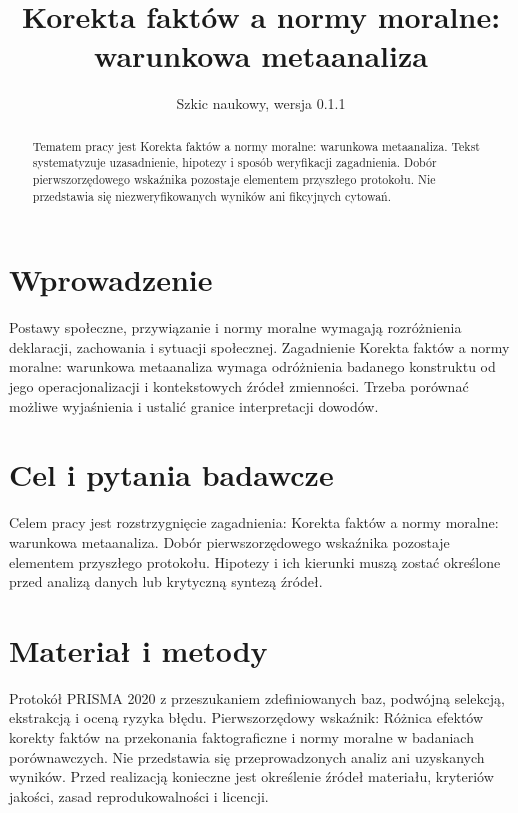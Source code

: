 \documentclass[11pt,a4paper]{article}
\title{Korekta faktów a normy moralne: warunkowa metaanaliza}
\author{}
\date{Szkic naukowy, wersja 0.1.1}
\begin{document}
\maketitle

\begin{abstract}

Tematem pracy jest Korekta faktów a normy moralne: warunkowa metaanaliza. Tekst systematyzuje uzasadnienie, hipotezy i sposób weryfikacji zagadnienia. Dobór pierwszorzędowego wskaźnika pozostaje elementem przyszłego protokołu. Nie przedstawia się niezweryfikowanych wyników ani fikcyjnych cytowań.

\end{abstract}

\section{Wprowadzenie}

Postawy społeczne, przywiązanie i normy moralne wymagają rozróżnienia deklaracji, zachowania i sytuacji społecznej. Zagadnienie Korekta faktów a normy moralne: warunkowa metaanaliza wymaga odróżnienia badanego konstruktu od jego operacjonalizacji i kontekstowych źródeł zmienności. Trzeba porównać możliwe wyjaśnienia i ustalić granice interpretacji dowodów.

\section{Cel i pytania badawcze}

Celem pracy jest rozstrzygnięcie zagadnienia: Korekta faktów a normy moralne: warunkowa metaanaliza. Dobór pierwszorzędowego wskaźnika pozostaje elementem przyszłego protokołu. Hipotezy i ich kierunki muszą zostać określone przed analizą danych lub krytyczną syntezą źródeł.

\section{Materiał i metody}

Protokół PRISMA 2020 z przeszukaniem zdefiniowanych baz, podwójną selekcją, ekstrakcją i oceną ryzyka błędu. Pierwszorzędowy wskaźnik: Różnica efektów korekty faktów na przekonania faktograficzne i normy moralne w badaniach porównawczych. Nie przedstawia się przeprowadzonych analiz ani uzyskanych wyników. Przed realizacją konieczne jest określenie źródeł materiału, kryteriów jakości, zasad reprodukowalności i licencji.
\end{document}
